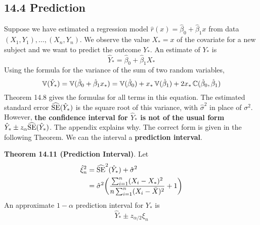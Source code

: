 \subsection*{14.4 Prediction}\label{prediction}
Suppose we have estimated a regression model
\(\hat{r}(x) = \hat{\beta}_{0} + \hat{\beta}_{1} x\) from data
\((X_{1}, Y_{1}), \dots, (X_{n}, Y_{n})\). We observe the value \(X_{*} = x\) of
the covariate for a new subject and we want to predict the outcome
\(Y_{*}\). An estimate of \(Y_{*}\) is
\[
\hat{Y}_{*} = \hat{\beta}_{0} + \hat{\beta}_{1} X_{*}
\]
Using the formula for the variance of the sum of two random variables,
\[
\operatorname{\mathbb{V}}(\hat{Y}_{*}) = \operatorname{\mathbb{V}}(\hat{\beta}_{0} + \hat{\beta}_{1} x_{*}) = \operatorname{\mathbb{V}}(\hat{\beta}_{0}) + x_{*} \operatorname{\mathbb{V}}(\hat{\beta}_{1}) + 2 x_{*} \operatorname{\mathbb{C}}(\hat{\beta}_{0}, \hat{\beta}_{1})
\]
Theorem 14.8 gives the formulas for all terms in this equation. The
estimated standard error \(\widehat{\operatorname{\mathrm{SE}}}(\hat{Y}_{*})\) is the square
root of this variance, with \(\hat{\sigma}^{2}\) in place of \(\sigma^{2}\).
However, \textbf{the confidence interval for \(\hat{Y}_{*}\) is not of the
usual form} \(\hat{Y}_{*} \pm z_{\alpha} \widehat{\operatorname{\mathrm{SE}}}(\hat{Y}_{*})\). The
appendix explains why. The correct form is given in the following
Theorem. We can the interval a \textbf{prediction interval}.

\textbf{Theorem 14.11 (Prediction Interval)}. Let
\begin{align*}
\hat{\xi}_{n}^{2} &= \widehat{\SE}^{2}(\hat{Y}_{*}) + \hat{\sigma}^{2} \\
&= \hat{\sigma}^{2} \left(\frac{\sum_{i=1}^{n} (X_{i} - X_{*})^{2}}{n \sum_{i=1}^{n} (X_{i} - \bar{X})^{2}} + 1 \right)
\end{align*}
An approximate \(1 - \alpha\) prediction interval for \(Y_{*}\) is
\[
\hat{Y}_{*} \pm z_{\alpha/2} \xi_{n}
\]

